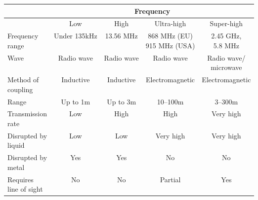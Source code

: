 \begin{tabular}{lcccc}
    & \multicolumn{4}{c}{Frequency} \\ \hline

    & Low & High & Ultra-high & Super-high \\ \hline

  \makecell[l]{Frequency\\range} & Under 135kHz & 13.56 MHz & \makecell{868 MHz (EU)\\915 MHz (USA)} & \makecell{2.45 GHz, \\ 5.8 MHz} \\

  Wave & Radio wave & Radio wave & Radio wave & \makecell{Radio wave/\\microwave} \\

  \makecell[l]{Method of\\coupling} & Inductive & Inductive & Electromagnetic & Electromagnetic \\

  Range & Up to 1m & Up to 3m & 10--100m & 3--300m \\

  \makecell[l]{Transmission\\rate} & Low & High & High & Very high \\

  \makecell[l]{Disrupted by\\liquid} & Low & Low & Very high & Very high \\

  \makecell[l]{Disrupted by\\metal} & Yes & Yes & No & No \\

  \makecell[l]{Requires\\line of sight} & No & No & Partial & Yes \\
\end{tabular}
